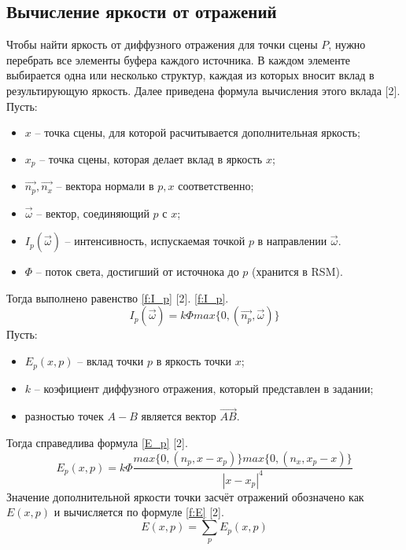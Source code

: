 {{        \subsection{Вычисление яркости от отражений} {
            Чтобы найти яркость от диффузного отражения для точки сцены $P$,
            нужно перебрать все элементы буфера каждого источника.
            В каждом элементе выбирается одна или несколько структур,
            каждая из которых вносит вклад в результирующую яркость.
            Далее приведена формула вычисления этого вклада [2]. \\
            Пусть:
            \begin{itemize}
                \item $x$ -- точка сцены, для которой расчитывается дополнительная яркость;
                \item $x_p$ -- точка сцены, которая делает вклад в яркость $x$;
                \item $\vec{n_p}, \vec{n_x}$ -- вектора нормали в $p, x$ соответственно;
                \item $\vec{\omega}$ -- вектор, соединяющий $p$ с $x$;
                \item $I_p(\vec{\omega})$ -- интенсивность, испускаемая точкой $p$ в
                направлении $\vec{\omega}$.
                \item $\Phi$ -- поток света, достигший от источнока до $p$ (хранится в RSM).
            \end{itemize}
            Тогда выполнено равенство \ref{f:I_p} [2].
            \ref{f:I_p}.
            \begin{equation}
                \label{f:I_p}
                I_p(\vec{\omega}) = k\Phi max\{0, (\vec{n_p}, \vec{\omega})\}
            \end{equation}
            Пусть:
            \begin{itemize}
                \item $E_p(x, p)$ -- вклад точки $p$ в яркость точки $x$;
                \item
                    $k$ -- коэфициент диффузного отражения,
                    который представлен в задании;
                \item разностью точек $A - B$ является вектор $\vec{AB}$.
            \end{itemize}
            Тогда справедлива формула \ref{E_p} [2].
            \begin{equation}
                \label{f:E_p}
                E_p(x, p) = k\Phi\frac{ max\{0, (n_p, x - x_p)\}
                max\{0, (n_x, x_p - x)\} }
                {|x - x_p|^4}
            \end{equation}
            Значение дополнительной яркости точки засчёт отражений
            обозначено как $E(x, p)$ и вычисляется по формуле \ref{f:E} [2].
            \begin{equation}
                \label{f:E}
                E(x, p) = \sum_p E_p(x, p)
            \end{equation}
        }
}}
